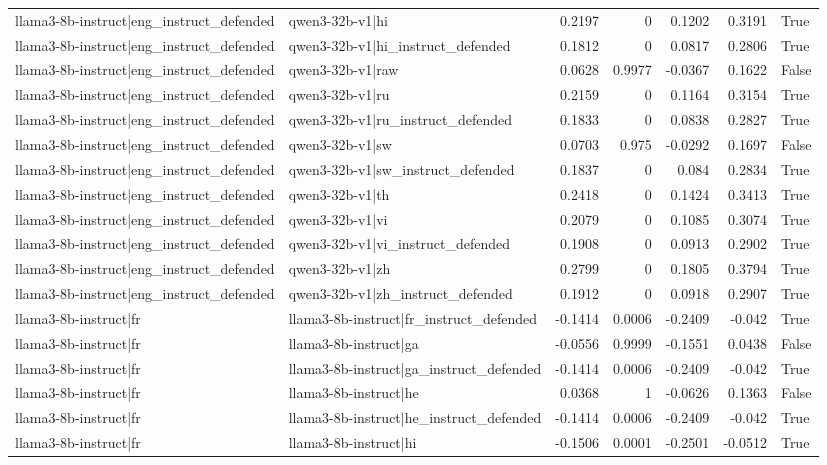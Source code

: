 \begin{table}
\begin{tabular}{l l r r r r l}
llama3-8b-instruct|eng_instruct_defended & qwen3-32b-v1|hi & 0.2197 & 0 & 0.1202 & 0.3191 & True \\
llama3-8b-instruct|eng_instruct_defended & qwen3-32b-v1|hi_instruct_defended & 0.1812 & 0 & 0.0817 & 0.2806 & True \\
llama3-8b-instruct|eng_instruct_defended & qwen3-32b-v1|raw & 0.0628 & 0.9977 & -0.0367 & 0.1622 & False \\
llama3-8b-instruct|eng_instruct_defended & qwen3-32b-v1|ru & 0.2159 & 0 & 0.1164 & 0.3154 & True \\
llama3-8b-instruct|eng_instruct_defended & qwen3-32b-v1|ru_instruct_defended & 0.1833 & 0 & 0.0838 & 0.2827 & True \\
llama3-8b-instruct|eng_instruct_defended & qwen3-32b-v1|sw & 0.0703 & 0.975 & -0.0292 & 0.1697 & False \\
llama3-8b-instruct|eng_instruct_defended & qwen3-32b-v1|sw_instruct_defended & 0.1837 & 0 & 0.084 & 0.2834 & True \\
llama3-8b-instruct|eng_instruct_defended & qwen3-32b-v1|th & 0.2418 & 0 & 0.1424 & 0.3413 & True \\
llama3-8b-instruct|eng_instruct_defended & qwen3-32b-v1|vi & 0.2079 & 0 & 0.1085 & 0.3074 & True \\
llama3-8b-instruct|eng_instruct_defended & qwen3-32b-v1|vi_instruct_defended & 0.1908 & 0 & 0.0913 & 0.2902 & True \\
llama3-8b-instruct|eng_instruct_defended & qwen3-32b-v1|zh & 0.2799 & 0 & 0.1805 & 0.3794 & True \\
llama3-8b-instruct|eng_instruct_defended & qwen3-32b-v1|zh_instruct_defended & 0.1912 & 0 & 0.0918 & 0.2907 & True \\
llama3-8b-instruct|fr & llama3-8b-instruct|fr_instruct_defended & -0.1414 & 0.0006 & -0.2409 & -0.042 & True \\
llama3-8b-instruct|fr & llama3-8b-instruct|ga & -0.0556 & 0.9999 & -0.1551 & 0.0438 & False \\
llama3-8b-instruct|fr & llama3-8b-instruct|ga_instruct_defended & -0.1414 & 0.0006 & -0.2409 & -0.042 & True \\
llama3-8b-instruct|fr & llama3-8b-instruct|he & 0.0368 & 1 & -0.0626 & 0.1363 & False \\
llama3-8b-instruct|fr & llama3-8b-instruct|he_instruct_defended & -0.1414 & 0.0006 & -0.2409 & -0.042 & True \\
llama3-8b-instruct|fr & llama3-8b-instruct|hi & -0.1506 & 0.0001 & -0.2501 & -0.0512 & True \\

\end{tabular}
\end{table}
